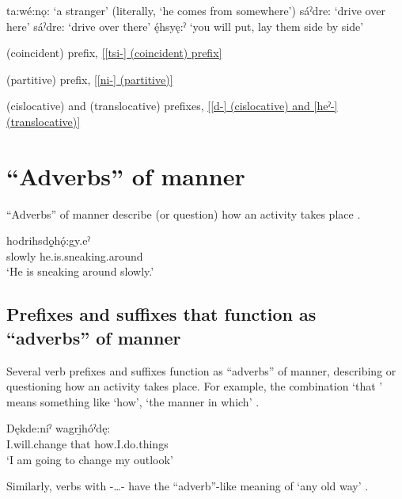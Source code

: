 \ea\label{ex:advex230} 
\ea\label{ex:advex230a}ta:wé:nǫ: ‘a stranger’ (literally, ‘he comes from somewhere’) 
\ex\label{ex:advex230b}sáˀdre: ‘drive over here’ 
\ex\label{ex:advex230c}sáˀdre: ‘drive over there’ 
\ex\label{ex:advex230d}ę́hsyę:ˀ ‘you will put, lay them side by side’
\z
\z

\begin{CayugaRelated}
\item{} (coincident) prefix, \ref{[tsi-] (coincident) prefix}

\item{} (partitive) prefix, \ref{[ni-] (partitive)}

\item{} (cislocative) and  (translocative) prefixes, \ref{[d-] (cislocative) and [heˀ-] (translocative)}
\end{CayugaRelated}




\section{“Adverbs” of manner} \label{ch:’Adverbs’ of manner}
“Adverbs” of manner describe (or question) how an activity takes place . 

\ea\label{ex:advex8} 
 \gll {} hodrihsdǫ̱hǫ́:gy.eˀ \\
slowly he.is.sneaking.around\\
\glt ‘He is sneaking around slowly.’ 
\z

\subsection{Prefixes and suffixes that function as “adverbs” of manner}
Several verb prefixes and suffixes function as “adverbs” of manner, describing or questioning how an activity takes place. For example, the combination  ‘that \partitive’ means something like ‘how’, ‘the manner in which’ .
	
\ea\label{ex:advex11} 
 \gll Dękde:níˀ  wagri̱hóˀdę:\\
I.will.change that how.I.do.things\\
\glt ‘I am going to change my outlook’
\z

Similarly, verbs with  \textsc{\contrastive-…-\diminutive} have the “adverb”-like meaning of ‘any old way’ .

